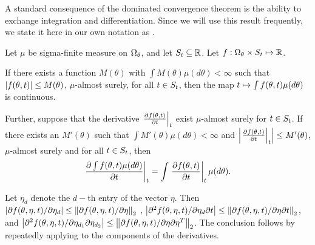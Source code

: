 
A standard consequence of the dominated convergence theorem is the ability to
exchange integration and differentiation.  Since we will use this result
frequently, we state it here in our own notation as .

\begin{thm}
\citep[Theorem 16.8]{billingsley:1986:probability}
%
Let $\mu$ be sigma-finite measure on $\Omega_{\theta}$, and let $S_t \subseteq
\mathbb{R}$.  Let $f:\Omega_{\theta} \times S_t \mapsto \mathbb{R}$.

If there exists a function $M(\theta)$ with $\int M(\theta) \mu(d\theta) <
\infty$ such that $\left|f(\theta, t)\right| \le M(\theta)$, $\mu$-almost surely,
for all $t \in S_t$, then the map $t \mapsto \int f(\theta, t)
\mu(d\theta)$ is continuous.

Further, suppose that the derivative $\left.\frac{\partial f(\theta, t)}{\partial
t}\right\vert_{t}$ exist $\mu$-almost surely for $t \in S_t$.  If there exists
an $M'(\theta)$ such that $\int M'(\theta) \mu(d\theta) < \infty$ and
$\left|\left.\frac{\partial f(\theta, t)}{\partial t}\right\vert_{t}\right| \le M'(\theta)$,
$\mu$-almost surely and for all $t \in S_t$, then
%
\begin{align*}
%
\fracat{\partial \int f(\theta, \t) \mu(d\theta)}{\partial \t}{\t} =
     \int \fracat{\partial f(\theta, \t)}{\partial \t}{\t} \mu(d\theta).
%
\end{align*}
%
\end{thm}


%

Let $\eta_d$ denote the $d-$th entry of the vector $\eta$.  Then
$\left|\partial f(\theta, \eta, t) / \partial \eta_d\right| \le
  \left\Vert\partial f(\theta, \eta, t) / \partial \eta\right\Vert_2$
,
$\left|\partial^2 f(\theta, \eta, t) / \partial \eta_d \partial t\right| \le
    \left\Vert\partial f(\theta, \eta, t) / \partial \eta \partial t\right\Vert_2$,
and
$\left|\partial^2 f(\theta, \eta, t) /
       \partial \eta_{d_1} \partial \eta_{d_2}\right| \le
     \left\Vert\partial f(\theta, \eta, t) / \partial \eta \partial\eta^T\right\Vert_2$.
%
The conclusion follows by repeatedly applying  to the components
of the derivatives.
%



